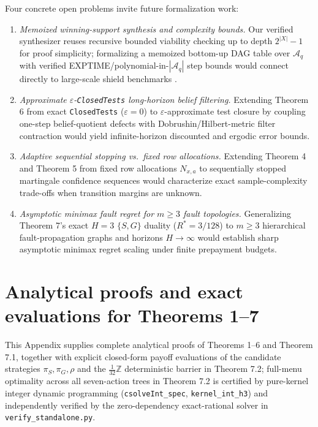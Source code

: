 \documentclass[11pt,a4paper]{article}
\providecommand{\tightlist}{\setlength{\itemsep}{2pt}\setlength{\parskip}{0pt}}
\begin{document}
Four concrete open problems invite future formalization work:

\begin{enumerate}
\def\labelenumi{\arabic{enumi}.}
\tightlist
\item
  \emph{Memoized winning-support synthesis and complexity bounds.} Our
  verified synthesizer reuses recursive bounded viability checking up to
  depth \(2^{|X|}-1\) for proof simplicity; formalizing a memoized
  bottom-up DAG table over \(\mathcal{A}_q\) with verified
  EXPTIME/polynomial-in-\(|\mathcal{A}_q|\) step bounds would connect
  directly to large-scale shield benchmarks \citep{junges2021}.
\item
  \emph{Approximate \(\varepsilon\)-\texttt{ClosedTests} long-horizon
  belief filtering.} Extending Theorem 6 from exact \texttt{ClosedTests}
  (\(\varepsilon = 0\)) to \(\varepsilon\)-approximate test closure by
  coupling one-step belief-quotient defects with
  Dobrushin/Hilbert-metric filter contraction \citep{dobrushin1956}
  would yield infinite-horizon discounted and ergodic error bounds.
\item
  \emph{Adaptive sequential stopping vs.~fixed row allocations.}
  Extending Theorem 4 and Theorem 5 from fixed row allocations
  \(N_{x,a}\) to sequentially stopped martingale confidence sequences
  \citep{wald1950, abbasiYadkori2011} would characterize exact
  sample-complexity trade-offs when transition margins are unknown.
\item
  \emph{Asymptotic minimax fault regret for \(m \ge 3\) fault
  topologies.} Generalizing Theorem 7's exact \(H=3\) \(\{S, G\}\)
  duality (\(R^* = 3/128\)) to \(m \ge 3\) hierarchical
  fault-propagation graphs and horizons \(H \to \infty\) would establish
  sharp asymptotic minimax regret scaling under finite prepayment
  budgets.
\end{enumerate}

\appendix

\section{Analytical proofs and exact evaluations for Theorems
1--7}\label{analytical-proofs-and-exact-evaluations-for-theorems-17}

This Appendix supplies complete analytical proofs of Theorems 1--6 and
Theorem 7.1, together with explicit closed-form payoff evaluations of
the candidate strategies \(\pi_S, \pi_G, \rho\) and the
\(\frac{1}{32}\mathbb{Z}\) deterministic barrier in Theorem 7.2;
full-menu optimality across all seven-action trees in Theorem 7.2 is
certified by pure-kernel integer dynamic programming
(\texttt{csolveInt\_spec}, \texttt{kernel\_int\_h3}) and independently
verified by the zero-dependency exact-rational solver in
\texttt{verify\_standalone.py}.
\end{document}
